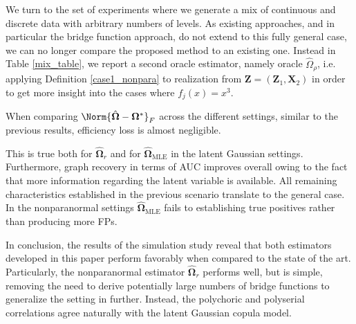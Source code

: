 We turn to the set of experiments where we generate a mix of continuous and discrete data with arbitrary numbers of levels. As existing approaches, and in particular the bridge function approach, do not extend to this fully general case, we can no longer compare the proposed method to an existing one. Instead in Table \ref{mix_table}, we report a second oracle estimator, namely oracle $\hat{\Omega}_\rho$, i.e. applying Definition \ref{case1_nonpara} to realization from $\boldsymbol{Z} = (\boldsymbol{Z}_1, \boldsymbol{X}_2)$ in order to get more insight into the cases where $f_j(x) = x^3$.

When comparing $\Norm{\hat{\boldsymbol\Omega} - \boldsymbol\Omega^*}_F$ across the different settings, similar to the previous results, efficiency loss is almost negligible.

\noindent This is true both for $\hat{\boldsymbol\Omega}_r$ and for $\hat{\boldsymbol\Omega}_{\text{MLE}}$ in the latent Gaussian settings. Furthermore, graph recovery in terms of AUC improves overall owing to the fact that more information regarding the latent variable is available.
All remaining characteristics established in the previous scenario translate to the general case. In the nonparanormal settings $\hat{\boldsymbol\Omega}_{\text{MLE}}$ fails to establishing true positives rather than producing more FPs.

In conclusion, the results of the simulation study reveal that both estimators developed in this paper perform favorably when compared to the state of the art. Particularly, the nonparanormal estimator $\hat{\boldsymbol\Omega}_r$
performs well, but is simple, removing the need to derive potentially large numbers of bridge functions to generalize the setting in \citet{Fan17} further. Instead, the polychoric and polyserial correlations agree naturally with the latent Gaussian copula model.